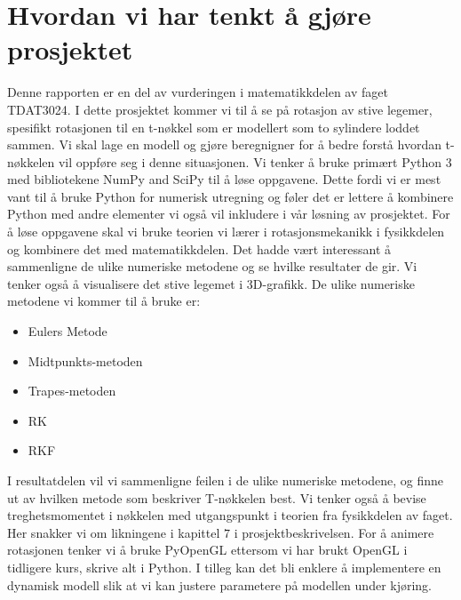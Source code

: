 \section*{Hvordan vi har tenkt å gjøre prosjektet}
Denne rapporten er en del av vurderingen i matematikkdelen av faget TDAT3024. I dette prosjektet kommer vi til å se på rotasjon av stive legemer, spesifikt rotasjonen til en t-nøkkel som er modellert som to sylindere loddet sammen. Vi skal lage en modell og gjøre beregnigner for å bedre forstå hvordan t-nøkkelen vil oppføre seg i denne situasjonen.\newline\newline
Vi tenker å bruke primært Python 3 med bibliotekene NumPy and SciPy til å løse oppgavene. Dette fordi vi er mest vant til å bruke Python for numerisk utregning og føler det er lettere å kombinere Python med andre elementer vi også vil inkludere i vår løsning av prosjektet. For å løse oppgavene skal vi bruke teorien vi lærer i rotasjonsmekanikk i fysikkdelen og kombinere det med matematikkdelen. Det hadde vært interessant å sammenligne de ulike numeriske metodene og se hvilke resultater de gir. Vi tenker også å visualisere det stive legemet i 3D-grafikk.\newline\newline
De ulike numeriske metodene vi kommer til å bruke er:
\begin{itemize}
    \item Eulers Metode
    \item Midtpunkts-metoden
    \item Trapes-metoden
    \item RK
    \item RKF
\end{itemize}
I resultatdelen vil vi sammenligne feilen i de ulike numeriske metodene, og finne ut av hvilken metode som beskriver T-nøkkelen best.\newline\newline
Vi tenker også å bevise treghetsmomentet i nøkkelen med utgangspunkt i teorien fra fysikkdelen av faget. Her snakker vi om likningene i kapittel $7$ i prosjektbeskrivelsen.\newline\newline
For å animere rotasjonen tenker vi å bruke PyOpenGL ettersom vi har brukt OpenGL i tidligere kurs, skrive alt i Python. I tilleg kan det bli enklere å implementere en dynamisk modell slik at vi kan justere parametere på modellen under kjøring.\newline\newline

